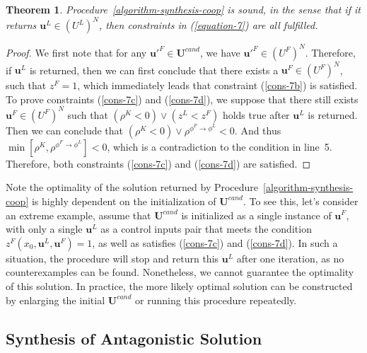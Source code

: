 \documentclass[letterpaper, 10 pt, conference]{ieeeconf}
\newtheorem{theorem}{\bf Theorem}
\begin{document}
\begin{theorem}\label{theo-1}
    Procedure~\ref{algorithm-synthesis-coop} is sound, in the sense that if it returns $\mathbf{u}^L\in (U^L)^N$, then constraints in (\ref{equation-7}) are all fulfilled.
\end{theorem}

\begin{proof}
    We first note that for any $\mathbf{u}'^F\in \mathbf{U}^{cand}$, we have $\mathbf{u}'^F\in (U^F)^N$. Therefore, if $\mathbf{u}^L$ is returned, then we can first conclude that there exists a $\mathbf{u}^F\in (U^F)^N$, such that $z^F=1$, which immediately leads that constraint (\ref{cons-7b}) is satisfied.
    To prove constraints (\ref{cons-7c}) and (\ref{cons-7d}), we suppose that there still exists $\mathbf{u}^F\in (U^F)^N$ such that $(\rho^K<0)\vee(z^L<z^F)$ holds true
    after $\mathbf{u}^L$ is returned.
    Then we can conclude that $(\rho^K<0)\vee \rho^{\phi^F\to\phi^L}<0$. And thus
    $\min[\rho^K,\rho^{\phi^F\to\phi^L}]<0$, which is a contradiction to the condition in line~5. Therefore, both constraints (\ref{cons-7c}) and (\ref{cons-7d}) are satisfied.
\end{proof}

Note the optimality of the solution returned by Procedure~\ref{algorithm-synthesis-coop} is highly dependent on the initialization of $\mathbf{U}^{cand}$. To see this, let's consider an extreme example, assume that $\mathbf{U}^{cand}$ is initialized as a single instance of $\mathbf{u}^F$, with only a single $\mathbf{u}^L$ as a control inputs pair that meets the condition $z^F(x_0,\mathbf{u}^L,\mathbf{u}^F)=1$, as well as satisfies (\ref{cons-7c}) and (\ref{cons-7d}). In such a situation, the procedure will stop and return this $\mathbf{u}^L$ after one iteration, as no counterexamples can be found. Nonetheless, we cannot guarantee the optimality of this solution. 
In practice, the more likely optimal solution can be constructed by enlarging the initial $\mathbf{U}^{cand}$ or running this procedure repeatedly.



\subsection{Synthesis of Antagonistic Solution}
\end{document}
